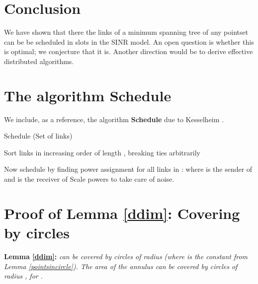 \documentclass[11pt]{amsart}
\begin{document}
\section{Conclusion}

We have shown that there the links of a minimum spanning tree of any pointset can be be scheduled in  slots in the SINR model. An open question is whether this is optimal; we conjecture that it is.
Another direction would be to derive effective distributed algorithms.


		

\appendix


\section{The algorithm Schedule}
\label{app:a}
We include, as a reference, the algorithm \textbf{Schedule} due to Kesselheim \cite{KesselheimSoda11}.

\begin{algorithm}                      \caption{Schedule (Set  of  links)}          \label{alg2}                           \begin{algorithmic}[1]                    \STATE Sort links in increasing order of length , breaking ties arbitrarily
     \STATE 
     \IF{} 
     \STATE 
      \ENDIF
     \ENDFOR

     \STATE Now schedule  by finding power assignment for all links in :
     \STATE 
     \STATE  where  is the sender of  and  is the receiver of 
     \ENDFOR
     \STATE Scale powers to take care of noise.
\end{algorithmic}
\label{alg2fig}
\end{algorithm}

\section{Proof of Lemma \ref{ddim}: Covering by circles}
\label{app:b}
\noindent \textbf{Lemma \ref{ddim}:} \emph{
 can be covered by  circles of radius 
 (where  is the constant from Lemma \ref{pointsincircle}). 
The area of the annulus  can be covered by  circles of radius , for .
}
\end{document}
